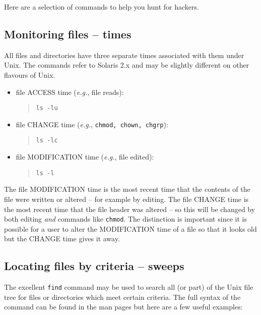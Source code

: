 \documentclass[11pt]{article}
\begin{document}
Here are a selection of commands to help you hunt for hackers.

\subsection{Monitoring files -- times}

All files and directories have three separate times associated with them under
Unix. The commands refer to Solaris 2.x and may be slightly different
on other flavours of Unix.

\begin{itemize}
\item file ACCESS time (\emph{e.g.}, file reads):
\begin{quote} {\tt ls -lu} \end{quote}
\item file CHANGE time (\emph{e.g.}, {\tt chmod, chown, chgrp}):
\begin{quote} {\tt ls -lc} \end{quote}
\item file MODIFICATION time (\emph{e.g.}, file edited):
\begin{quote} {\tt ls -l} \end{quote}
\end{itemize}

The file MODIFICATION time is the most recent time that the contents of
the file were written or altered -- for example by editing. The file
CHANGE time is the most recent time that the file header was altered --
so this will be changed by both editing {\em and} commands like {\tt chmod}.
The distinction is important since it is possible for a user to alter
the MODIFICATION time of a file so that it looks old but the CHANGE
time gives it away.

\subsection{Locating files by criteria -- sweeps}

The excellent {\tt find} command may be used to search all (or part)
of the Unix file tree for files or directories which meet certain
criteria. The full syntax of the command can be found in the man pages
but here are a few useful examples:
\end{document}

